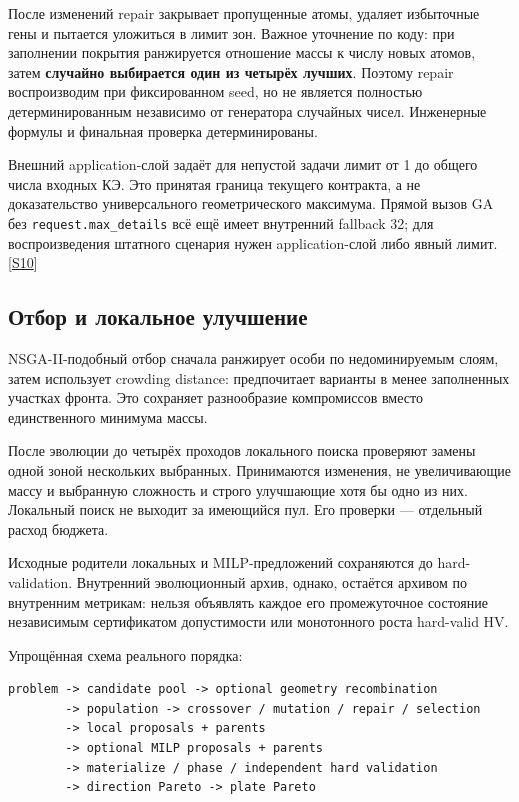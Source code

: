 \documentclass[11pt,a4paper]{article}
\begin{document}
После изменений repair закрывает пропущенные атомы, удаляет избыточные гены и пытается уложиться в лимит зон. Важное уточнение по коду: при заполнении покрытия ранжируется отношение массы к числу новых атомов, затем \textbf{случайно выбирается один из четырёх лучших}. Поэтому repair воспроизводим при фиксированном seed, но не является полностью детерминированным независимо от генератора случайных чисел. Инженерные формулы и финальная проверка детерминированы.


Внешний application-слой задаёт для непустой задачи лимит от 1 до общего числа входных КЭ. Это принятая граница текущего контракта, а не доказательство универсального геометрического максимума. Прямой вызов GA без {\small\nolinkurl{request.max_details}} всё ещё имеет внутренний fallback 32; для воспроизведения штатного сценария нужен application-слой либо явный лимит. {\color{Teal}\small[\hyperlink{S10}{S10}]}


\subsection{Отбор и локальное улучшение}

NSGA-II-подобный отбор сначала ранжирует особи по недоминируемым слоям, затем использует crowding distance: предпочитает варианты в менее заполненных участках фронта. Это сохраняет разнообразие компромиссов вместо единственного минимума массы.


После эволюции до четырёх проходов локального поиска проверяют замены одной зоной нескольких выбранных. Принимаются изменения, не увеличивающие массу и выбранную сложность и строго улучшающие хотя бы одно из них. Локальный поиск не выходит за имеющийся пул. Его проверки — отдельный расход бюджета.


Исходные родители локальных и MILP-предложений сохраняются до hard-validation. Внутренний эволюционный архив, однако, остаётся архивом по внутренним метрикам: нельзя объявлять каждое его промежуточное состояние независимым сертификатом допустимости или монотонного роста hard-valid HV.


Упрощённая схема реального порядка:


\begin{Verbatim}[fontsize=\scriptsize,frame=single,rulecolor=\color{gray!30},framesep=8pt]
problem -> candidate pool -> optional geometry recombination
        -> population -> crossover / mutation / repair / selection
        -> local proposals + parents
        -> optional MILP proposals + parents
        -> materialize / phase / independent hard validation
        -> direction Pareto -> plate Pareto
\end{Verbatim}
\end{document}
